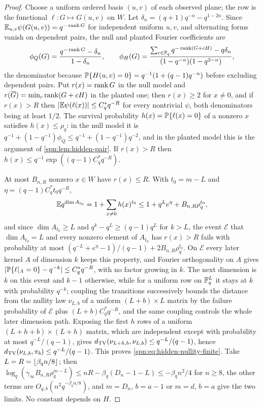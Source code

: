 \begin{proof}
Choose a uniform ordered basis $(u,v)$ of each observed plane; the row is the functional
$\ell:G\mapsto G(u,v)$ on $W$. Let $\delta_n=(q+1)q^{-n}-q^{1-2n}$. Since
$\mathbb{E}_{u,v}\psi(G(u,v))=q^{-\operatorname{rank} G}$ for independent uniform $u,v$, and alternating forms vanish on
dependent pairs, the null and planted Fourier coefficients are
\[
 \phi_Q(G)=\frac{q^{-\operatorname{rank} G}-\delta_n}{1-\delta_n},\qquad
 \phi_H(G)=\frac{\sum_{c\in\mathbb{F}_q}q^{-\operatorname{rank}(G+cH)}-q\delta_n}{(1-q^{-n})(1-q^{2-n})},
\]
the denominator because $\mathbb{P}\{H(u,v)=0\}=q^{-1}(1+(q-1)q^{-n})$ before excluding dependent pairs.
Put $r(x)=\operatorname{rank} G$ in the null model and $r(\overline G)=\min_c\operatorname{rank}(G+cH)$ in the planted one; then
$r(x)\ge2$ for $x\ne0$, and if $r(x)>R$ then $\lvert\mathbb{E}\psi(\ell(x))\rvert\le C^\ast_qq^{-R}$ for every
nontrivial $\psi$, both denominators being at least $1/2$. The survival probability $h(x)=\mathbb{P}\{\ell(x)=0\}$
of a nonzero $x$ satisfies $h(x)\le\rho_q$: in the null model it is $q^{-1}+(1-q^{-1})\phi_Q\le
q^{-1}+(1-q^{-1})q^{-2}$, and in the planted model this is the argument of \cref{spn:lem:hidden-pair}.
If $r(x)>R$ then $h(x)\le q^{-1}\exp((q-1)C^\ast_qq^{-R})$.

At most $B_{n,R}$ nonzero $x\in W$ have $r(x)\le R$. With $t_0=m-L$ and $\eta=(q-1)C^\ast_qt_0q^{-R}$,
\[
 \mathbb{E} q^{\dim A_{t_0}}=1+\sum_{x\ne0}h(x)^{t_0}\le1+q^Le^\eta+B_{n,R}\rho_q^{t_0},
\]
and since $\dim A_{t_0}\ge L$ and $q^k-q^L\ge(q-1)q^L$ for $k>L$, the event $\mathcal E$ that
$\dim A_{t_0}=L$ and every nonzero element of $A_{t_0}$ has $r(x)>R$ fails with probability at most
$(q^{-L}+e^\eta-1)/(q-1)+2B_{n,R}\rho_q^{t_0}$. On $\mathcal E$ every later kernel $A$ of dimension $k$
keeps this property, and Fourier orthogonality on $A$ gives
$\lvert\mathbb{P}\{\ell|_A=0\}-q^{-k}\rvert\le C^\ast_qq^{-R}$, with no factor growing in $k$. The next dimension
is $k$ on this event and $k-1$ otherwise, while for a uniform row on $\mathbb{F}_q^L$ it stays at $k$ with
probability $q^{-k}$; coupling the transitions successively bounds the distance from the nullity law
$\nu_{L,b}$ of a uniform $(L+b)\times L$ matrix by the failure probability of $\mathcal E$ plus
$(L+b)C^\ast_qq^{-R}$, and the same coupling controls the whole later dimension path. Exposing the first
$h$ rows of a uniform $(L+h+b)\times(L+h)$ matrix, which are independent except with probability at most
$q^{-L}/(q-1)$, gives $d_{\mathrm{TV}}(\nu_{L+h,b},\nu_{L,b})\le q^{-L}/(q-1)$, hence
$d_{\mathrm{TV}}(\nu_{L,b},\pi_b)\le q^{-L}/(q-1)$. This proves \eqref{spn:eq:hidden-nullity-finite}. Take
$L=R=\lfloor\beta_qn/8\rfloor$; then $\log_q(\gamma_\infty B_{n,R}\rho_q^{m-L})\le nR-\beta_q(D_n-1-L)\le
-\beta_qn^2/4$ for $n\ge8$, the other terms are $O_{q,b}(n^2q^{-\beta_qn/8})$, and $m=D_n$, $b=a-1$ or
$m=d$, $b=a$ give the two limits. No constant depends on $H$.
\end{proof}

